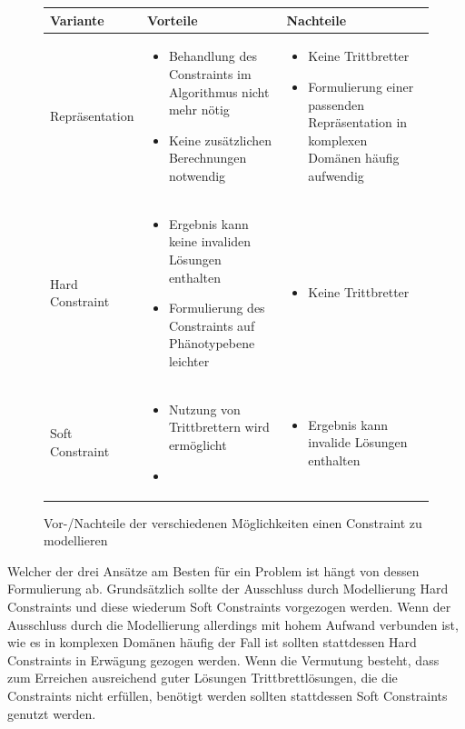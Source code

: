 \begin{figure}
	\centering
	\begin{tabularx}{.9\textwidth}{ll}\hline
		Variante 		& Vorteile 		& Nachteile \\\hline
		Repräsentation 	& 
		\begin{itemize}
			\item Behandlung des Constraints im Algorithmus nicht mehr nötig
			\item Keine zusätzlichen Berechnungen notwendig
		\end{itemize} &
		\begin{itemize}
			\item Keine Trittbretter
			\item Formulierung einer passenden Repräsentation in komplexen Domänen häufig aufwendig
		\end{itemize} \\
		Hard Constraint &
		\begin{itemize}
			\item Ergebnis kann keine invaliden Lösungen enthalten
			\item Formulierung des Constraints auf Phänotypebene leichter
		\end{itemize} &
		\begin{itemize}
			\item Keine Trittbretter
		\end{itemize} \\
		Soft Constraint &
		\begin{itemize}
			\item Nutzung von Trittbrettern wird ermöglicht
			\item 
		\end{itemize} &
		\begin{itemize}
			\item Ergebnis kann invalide Lösungen enthalten
		\end{itemize} \\
	\end{tabularx}
	\caption{Vor-/Nachteile der verschiedenen Möglichkeiten einen Constraint zu modellieren}
	\label{tab:methods_constraint}
\end{figure}

Welcher der drei Ansätze am Besten für ein Problem ist hängt von dessen Formulierung ab.
Grundsätzlich sollte der Ausschluss durch Modellierung Hard Constraints und diese wiederum Soft Constraints vorgezogen werden.
Wenn der Ausschluss durch die Modellierung allerdings mit hohem Aufwand verbunden ist, wie es in komplexen Domänen häufig der Fall ist sollten stattdessen Hard Constraints in Erwägung gezogen werden.
Wenn die Vermutung besteht, dass zum Erreichen ausreichend guter Lösungen Trittbrettlösungen, die die Constraints nicht erfüllen, benötigt werden sollten stattdessen Soft Constraints genutzt werden.

